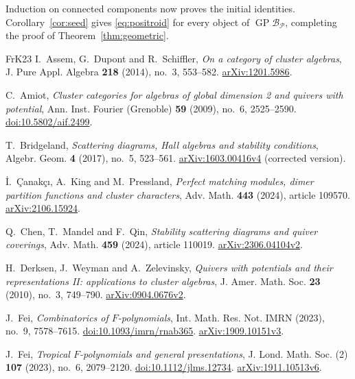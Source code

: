 \documentclass[11pt]{amsart}
\numberwithin{equation}{section}
\theoremstyle{definition}
\theoremstyle{remark}
\newcommand{\op}[1]{\operatorname{#1}}
\newcommand{\Pcal}{\mathcal P}
\newcommand{\GP}{\op{GP}}
\begin{document}
Induction on connected components now proves the initial identities.
Corollary~\ref{cor:seed} gives \eqref{eq:positroid} for every object of
$\GP\mathcal B_\Pcal$, completing the proof of
Theorem~\ref{thm:geometric}.

\begin{thebibliography}{FrK23}
I.~Assem, G.~Dupont and R.~Schiffler,
\emph{On a category of cluster algebras},
J. Pure Appl. Algebra \textbf{218} (2014), no.~3, 553--582.
\href{https://arxiv.org/abs/1201.5986}{arXiv:1201.5986}.

C.~Amiot, \emph{Cluster categories for algebras of global dimension 2
and quivers with potential},
Ann. Inst. Fourier (Grenoble) \textbf{59} (2009), no.~6, 2525--2590.
\href{https://doi.org/10.5802/aif.2499}{doi:10.5802/aif.2499}.

T.~Bridgeland, \emph{Scattering diagrams, Hall algebras and stability conditions},
Algebr. Geom. \textbf{4} (2017), no.~5, 523--561.
\href{https://arxiv.org/abs/1603.00416v4}{arXiv:1603.00416v4} (corrected version).

\.I.~\c{C}anak\c{c}\i, A.~King and M.~Pressland,
\emph{Perfect matching modules, dimer partition functions and cluster characters},
Adv. Math. \textbf{443} (2024), article 109570.
\href{https://arxiv.org/abs/2106.15924}{arXiv:2106.15924}.

Q.~Chen, T.~Mandel and F.~Qin,
\emph{Stability scattering diagrams and quiver coverings},
Adv. Math. \textbf{459} (2024), article 110019.
\href{https://arxiv.org/abs/2306.04104v2}{arXiv:2306.04104v2}.


H.~Derksen, J.~Weyman and A.~Zelevinsky,
\emph{Quivers with potentials and their representations II:
applications to cluster algebras},
J. Amer. Math. Soc. \textbf{23} (2010), no.~3, 749--790.
\href{https://arxiv.org/abs/0904.0676v2}{arXiv:0904.0676v2}.

J.~Fei, \emph{Combinatorics of $F$-polynomials},
Int. Math. Res. Not. IMRN (2023), no.~9, 7578--7615.
\href{https://doi.org/10.1093/imrn/rnab365}{doi:10.1093/imrn/rnab365}.
\href{https://arxiv.org/abs/1909.10151v3}{arXiv:1909.10151v3}.

J.~Fei, \emph{Tropical $F$-polynomials and general presentations},
J. Lond. Math. Soc. (2) \textbf{107} (2023), no.~6, 2079--2120.
\href{https://doi.org/10.1112/jlms.12734}{doi:10.1112/jlms.12734}.
\href{https://arxiv.org/abs/1911.10513v6}{arXiv:1911.10513v6}.


\end{thebibliography}
\end{document}
